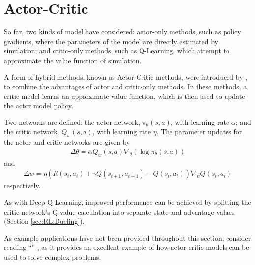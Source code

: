 \section{Actor-Critic}

So far, two kinds of model have considered:
actor-only methods, such as policy gradients, where the parameters of the model
are directly estimated by simulation;
and critic-only methods, such as Q-Learning, which attempt to approximate the
value function of simulation.

A form of hybrid methods, known as Actor-Critic methods, were introduced by
\cite{Konda:2000:Actor}, to combine the advantages of actor and critic-only
methods.
In these methods, a critic model learns an approximate value function, which is
then used to update the actor model policy.

Two networks are defined:
the actor network, $\pi_\theta(s,a)$, with learning rate $\alpha$;
and the critic network, $Q_w(s,a)$, with learning rate $\eta$.
The parameter updates for the actor and critic networks are given by
\begin{align*}
    \Delta\theta = \alpha Q_w(s,a)\nabla_\theta(\log\pi_\theta(s,a))
\end{align*}
and
\begin{align*}
    \Delta w = \eta (R(s_t,a_t) + \gamma Q(s_{t+1},a_{t+1}) - Q(s_t,a_t))\nabla_wQ(s_t,a_t)
\end{align*}
respectively.

As with Deep Q-Learning, improved performance can be achieved by splitting the
critic network's Q-value calculation into separate state and advantage values
(Section \ref{sec:RL:Dueling}).

As example applications have not been provided throughout this section, consider
reading ``'' \citep{Peng:2017:Deeploco}, as it
provides an excellent example of how actor-critic models can be used to solve
complex problems.

